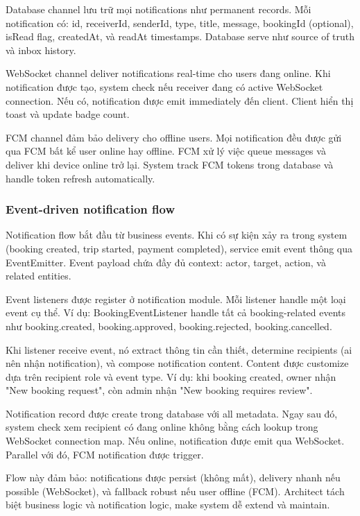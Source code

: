 Database channel lưu trữ mọi notifications như permanent records. Mỗi notification có: id, receiverId, senderId, type, title, message, bookingId (optional), isRead flag, createdAt, và readAt timestamps. Database serve như source of truth và inbox history.

WebSocket channel deliver notifications real-time cho users đang online. Khi notification được tạo, system check nếu receiver đang có active WebSocket connection. Nếu có, notification được emit immediately đến client. Client hiển thị toast và update badge count.

FCM channel đảm bảo delivery cho offline users. Mọi notification đều được gửi qua FCM bất kể user online hay offline. FCM xử lý việc queue messages và deliver khi device online trở lại. System track FCM tokens trong database và handle token refresh automatically.

\subsubsection{Event-driven notification flow}
Notification flow bắt đầu từ business events. Khi có sự kiện xảy ra trong system (booking created, trip started, payment completed), service emit event thông qua EventEmitter. Event payload chứa đầy đủ context: actor, target, action, và related entities.

Event listeners được register ở notification module. Mỗi listener handle một loại event cụ thể. Ví dụ: BookingEventListener handle tất cả booking-related events như booking.created, booking.approved, booking.rejected, booking.cancelled.

Khi listener receive event, nó extract thông tin cần thiết, determine recipients (ai nên nhận notification), và compose notification content. Content được customize dựa trên recipient role và event type. Ví dụ: khi booking created, owner nhận "New booking request", còn admin nhận "New booking requires review".

Notification record được create trong database với all metadata. Ngay sau đó, system check xem recipient có đang online không bằng cách lookup trong WebSocket connection map. Nếu online, notification được emit qua WebSocket. Parallel với đó, FCM notification được trigger.

Flow này đảm bảo: notifications được persist (không mất), delivery nhanh nếu possible (WebSocket), và fallback robust nếu user offline (FCM). Architect tách biệt business logic và notification logic, make system dễ extend và maintain.

